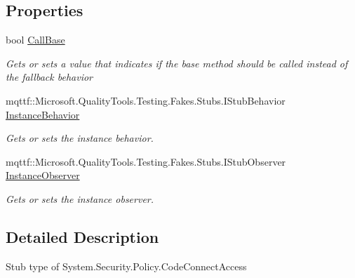 \subsection*{Properties}
\begin{DoxyCompactItemize}
\item 
bool \hyperlink{class_system_1_1_security_1_1_policy_1_1_fakes_1_1_stub_code_connect_access_a75f66891835d4a8757ce93dfce0bde3e}{Call\-Base}
\begin{DoxyCompactList}\small\item\em Gets or sets a value that indicates if the base method should be called instead of the fallback behavior\end{DoxyCompactList}\item 
mqttf\-::\-Microsoft.\-Quality\-Tools.\-Testing.\-Fakes.\-Stubs.\-I\-Stub\-Behavior \hyperlink{class_system_1_1_security_1_1_policy_1_1_fakes_1_1_stub_code_connect_access_a5e74803b4d45952d3dfbca5c33da4ed6}{Instance\-Behavior}
\begin{DoxyCompactList}\small\item\em Gets or sets the instance behavior.\end{DoxyCompactList}\item 
mqttf\-::\-Microsoft.\-Quality\-Tools.\-Testing.\-Fakes.\-Stubs.\-I\-Stub\-Observer \hyperlink{class_system_1_1_security_1_1_policy_1_1_fakes_1_1_stub_code_connect_access_ad7c6dbd37247a42f01ff8df0903f9348}{Instance\-Observer}
\begin{DoxyCompactList}\small\item\em Gets or sets the instance observer.\end{DoxyCompactList}\end{DoxyCompactItemize}


\subsection{Detailed Description}
Stub type of System.\-Security.\-Policy.\-Code\-Connect\-Access



